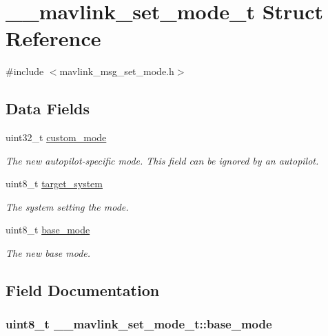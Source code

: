 \hypertarget{struct____mavlink__set__mode__t}{\section{\+\_\+\+\_\+mavlink\+\_\+set\+\_\+mode\+\_\+t Struct Reference}
\label{struct____mavlink__set__mode__t}
}


{\ttfamily \#include $<$mavlink\+\_\+msg\+\_\+set\+\_\+mode.\+h$>$}

\subsection*{Data Fields}
\begin{DoxyCompactItemize}
\item 
uint32\+\_\+t \hyperlink{struct____mavlink__set__mode__t_ab932915605e53ff1f42c57f3159b63f6}{custom\+\_\+mode}
\begin{DoxyCompactList}\small\item\em The new autopilot-\/specific mode. This field can be ignored by an autopilot. \end{DoxyCompactList}\item 
uint8\+\_\+t \hyperlink{struct____mavlink__set__mode__t_a58cf8afdf2920c038cae4645c79ac372}{target\+\_\+system}
\begin{DoxyCompactList}\small\item\em The system setting the mode. \end{DoxyCompactList}\item 
uint8\+\_\+t \hyperlink{struct____mavlink__set__mode__t_a7a48085507fabce566221fb4ede8c8a6}{base\+\_\+mode}
\begin{DoxyCompactList}\small\item\em The new base mode. \end{DoxyCompactList}\end{DoxyCompactItemize}


\subsection{Field Documentation}
\hypertarget{struct____mavlink__set__mode__t_a7a48085507fabce566221fb4ede8c8a6}{
\subsubsection[{base\+\_\+mode}]{\setlength{\rightskip}{0pt plus 5cm}uint8\+\_\+t \+\_\+\+\_\+mavlink\+\_\+set\+\_\+mode\+\_\+t\+::base\+\_\+mode}}\label{struct____mavlink__set__mode__t_a7a48085507fabce566221fb4ede8c8a6}


